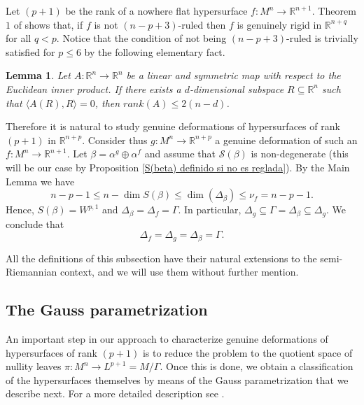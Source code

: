 \documentclass{article}
\newtheorem{lema}[thm]{Lemma}
\theoremstyle{remark}
\begin{document}
Let $(p+1)$ be the rank of a nowhere flat hypersurface $f:M^n\rightarrow\mathbb{R}^{n+1}$. Theorem $1$ of \cite{DF3} shows that, if $f$ is not $(n-p+3)$-ruled then $f$ is genuinely rigid in $\mathbb{R}^{n+q}$ for all $q<p$. Notice that the condition of not being $(n-p+3)$-ruled is trivially satisfied for $p\leq 6$ by the following elementary fact.
\begin{lema}\label{AR,R=0}
    Let $A:\mathbb{R}^n\rightarrow\mathbb{R}^n$ be a linear and symmetric map with respect to the Euclidean inner product. If there exists a $d$-dimensional subspace $R\subseteq\mathbb{R}^n$ such that $\langle A(R),R\rangle=0$, then $rank(A)\leq 2(n-d)$.
\end{lema}
Therefore it is natural to study genuine deformations of hypersurfaces of rank $(p+1)$ in $\mathbb{R}^{n+p}$.
Consider thus $g:M^n\rightarrow\mathbb{R}^{n+p}$ a genuine deformation of such an $f:M^n\rightarrow\mathbb{R}^{n+1}$. Let $\beta=\alpha^g\oplus\alpha^f$ and assume that $\mathcal{S}(\beta)$ is non-degenerate (this will be our case by Proposition \ref{S(beta) definido si no es reglada}). By the Main Lemma we have
$$n-p-1\leq n-\dim S(\beta)\leq \dim(\Delta_\beta)\leq\nu_f=n-p-1.$$ 
Hence, $S(\beta)=W^{p,1}$ and $\Delta_\beta=\Delta_f=\Gamma$. In particular, $\Delta_g\subseteq\Gamma=\Delta_\beta\subseteq\Delta_g$. We conclude that
\begin{equation*}
    \Delta_f=\Delta_g=\Delta_\beta=\Gamma.
\end{equation*}

All the definitions of this subsection have their natural extensions to the semi-Riemannian context, and we will use them without further mention.

\subsection{The Gauss parametrization}\label{seccion parametrizacion de gauss}
An important step in our approach to characterize genuine deformations of hypersurfaces of rank $(p+1)$ is to reduce the problem to the quotient space of nullity leaves $\pi:M^n\rightarrow L^{p+1}=M/\Gamma$. Once this is done, we obtain a classification of the hypersurfaces themselves by means of the Gauss parametrization that we describe next. For a more detailed description see \cite{DG}. 

\text{ }
\end{document}
